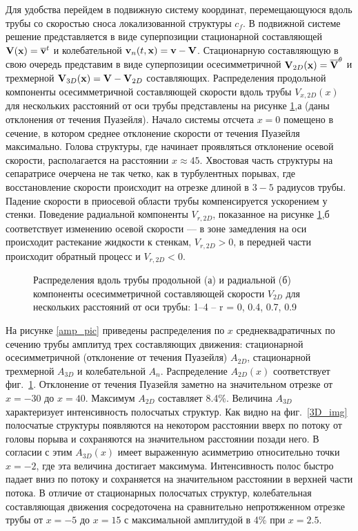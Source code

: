 Для удобства перейдем в подвижную систему координат, перемещающуюся вдоль трубы со скоростью сноса локализованной структуры $c_f$. В подвижной системе решение представляется в виде суперпозиции стационарной составляющей $\mathbf{V}(\mathbf{x}) = \overline{\mathbf{v}}^t$ и колебательной $\mathbf{v}_n(t,\mathbf{x}) = \mathbf{v} - \mathbf{V}$. Стационарную составляющую в свою очередь представим в виде суперпозиции осесимметричной $\mathbf{V}_{2D}(\mathbf{x}) = \overline{\mathbf{V}}^{\theta}$ и трехмерной $\mathbf{V}_{3D}(\mathbf{x})=\mathbf{V} - \mathbf{V}_{2D}$ составляющих. Распределения продольной компоненты осесимметричной составляющей скорости вдоль трубы $V_{x,2D}(x)$ для нескольких расстояний от оси трубы представлены на рисунке \ref{U2D_pic},а (даны отклонения от течения Пуазейля). Начало системы отсчета $x=0$ помещено в сечение, в котором среднее отклонение скорости от течения Пуазейля максимально. Голова структуры, где начинает проявляться отклонение осевой скорости, располагается на расстоянии $x \approx 45$. Хвостовая часть структуры на сепаратрисе очерчена не так четко, как в турбулентных порывах, где восстановление скорости происходит на отрезке длиной в $3-5$ радиусов трубы.  Падение скорости в приосевой области трубы компенсируется ускорением у стенки. Поведение радиальной компоненты $V_{r,2D}$, показанное на рисунке \ref{U2D_pic},б соответствует изменению осевой скорости --- в зоне замедления на оси происходит растекание жидкости к стенкам, $V_{r,2D}>0$, в передней части происходит обратный процесс и $V_{r,2D}<0$.

\begin{figure}[h]
\caption{Распределения вдоль трубы продольной (а) и радиальной (б) компоненты осесимметричной составляющей скорости $V_{2D}$ для нескольких расстояний от оси
трубы: 1–4 – r = 0, 0.4, 0.7, 0.9}
\label{U2D_pic}
\end{figure}

На рисунке \ref{amp_pic} приведены распределения по $x$ среднеквадратичных по сечению трубы амплитуд трех составляющих движения: стационарной осесимметричной (отклонение от течения Пуазейля) $A_{2D}$, стационарной трехмерной $A_{3D}$ и колебательной $A_n$. Распределение $A_{2D}(x)$ соответствует фиг.~\ref{U2D_pic}. Отклонение от течения Пуазейля заметно на значительном отрезке от $x=-30$ до $x=40$. Максимум $A_{2D}$ составляет 8.4\%. Величина $A_{3D}$ характеризует интенсивность полосчатых структур. Как видно на фиг.~\ref{3D_img} полосчатые структуры появляются на некотором расстоянии вверх по потоку от головы порыва и сохраняются на значительном расстоянии позади него. В согласии с этим $A_{3D}(x)$ имеет выраженную асимметрию относительно точки $x=-2$, где эта величина достигает максимума. Интенсивность полос быстро падает вниз по потоку и сохраняется на значительном расстоянии в верхней части потока. В отличие от стационарных полосчатых структур, колебательная составляющая движения сосредоточена на сравнительно непротяженном отрезке трубы от $x=-5$ до $x=15$ с максимальной амплитудой в 4\% при $x=2.5$.


